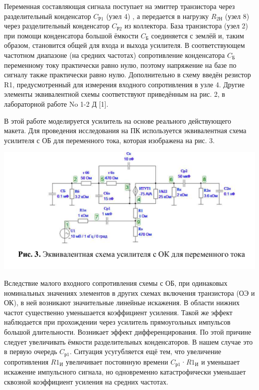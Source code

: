 \documentclass[a4paper,14pt]{extarticle}
\begin{document}
\begin{singlespace}
    Переменная составляющая сигнала поступает на эмиттер транзистора
    через разделительный конденсатор $C_{\text{Р1}}$ (узел 4) , а передается в нагрузку $R_{\text{2Н}}$ (узел
    8) через разделительный конденсатор $C_{\text{Р2}}$ из коллектора. База транзистора (узел
    2) при помощи конденсатора большой ёмкости $C_{\text{Б}}$ соединяется с землёй и,
    таким образом, становится общей для входа и выхода усилителя. В
    соответствующем частотном диапазоне (на средних частотах) сопротивление
    конденсатора $C_{\text{Б}}$ переменному току практически равно нулю, поэтому
    напряжение на базе по сигналу также практически равно нулю. Дополнительно
    в схему введён резистор R1, предусмотренный для измерения входного
    сопротивления в узле 4. Другие элементы эквивалентной схемы соответствуют
    приведённым на рис. 2, в лабораторной работе No 1-2 Д [1].

    В этой работе моделируется усилитель на основе реального действующего
    макета. Для проведения исследования на ПК используется эквивалентная схема
    усилителя с ОБ для переменного тока, которая изображена на рис. 3.

    \begin{center}
        \includegraphics[scale=0.8]{0.3.png}
    \end{center}

    Вследствие малого входного сопротивления схемы с ОБ, при одинаковых
    номинальных значениях элементов в других схемах включения транзистора
    (ОЭ и ОК), в ней возникают значительные линейные искажения. В области
    нижних частот существенно уменьшается коэффициент усиления. Такой же
    эффект наблюдается при прохождении через усилитель прямоугольных
    импульсов большой длительности. Возникает эффект дифференцирования. По
    этой причине следует увеличивать ёмкости разделительных конденсаторов. В
    нашем случае это в первую очередь $C_{\text{р1}}$. Ситуация усугубляется ещё тем, что
    увеличение сопротивления $R1_{\text{И}}$ увеличивает постоянную времени $C_{\text{р1}}$·$R1_{\text{И}}$ и
    уменьшает искажение импульсного сигнала, но одновременно катастрофически
    уменьшает сквозной коэффициент усиления на средних частотах.
    \end{singlespace}
\end{document}
